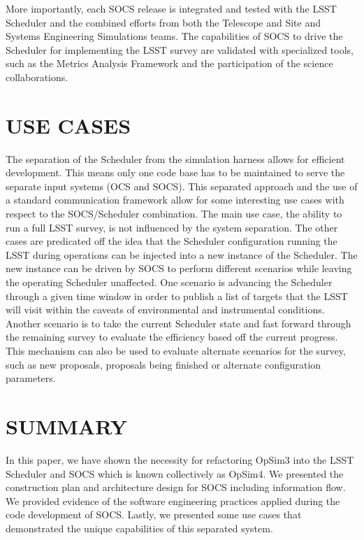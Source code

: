 \documentclass[]{spie}  %
\begin{document}
More importantly, each SOCS release is integrated and tested with the LSST Scheduler and the combined efforts from both the Telescope and Site and Systems Engineering Simulations teams. The capabilities of SOCS to drive the Scheduler for implementing the LSST survey are validated with specialized tools, such as the Metrics Analysis Framework\cite{2014SPIE.9149E..0BJ} and the participation of the science collaborations.

\section{USE CASES}

The separation of the Scheduler from the simulation harness allows for efficient development. This means only one code base has to be maintained to serve the separate input systems (OCS and SOCS). This separated approach and the use of a standard communication framework allow for some interesting use cases with respect to the SOCS/Scheduler combination. The main use case, the ability to run a full LSST survey, is not influenced by the system separation. The other cases are predicated off the idea that the Scheduler configuration running the LSST during operations can be injected into a new instance of the Scheduler. The new instance can be driven by SOCS to perform different scenarios while leaving the operating Scheduler unaffected. One scenario is advancing the Scheduler through a given time window in order to publish a list of targets that the LSST will visit within the caveats of environmental and instrumental conditions. Another scenario is to take the current Scheduler state and fast forward through the remaining survey to evaluate the efficiency based off the current progress. This mechanism can also be used to evaluate alternate scenarios for the survey, such as new proposals, proposals being finished or alternate configuration parameters.

\section{SUMMARY}

In this paper, we have shown the necessity for refactoring OpSim3 into the LSST Scheduler and SOCS which is known collectively as OpSim4. We presented the construction plan and architecture design for SOCS including information flow. We provided evidence of the software engineering practices applied during the code development of SOCS. Lastly, we presented some use cases that demonstrated the unique capabilities of this separated system. 
\end{document}
